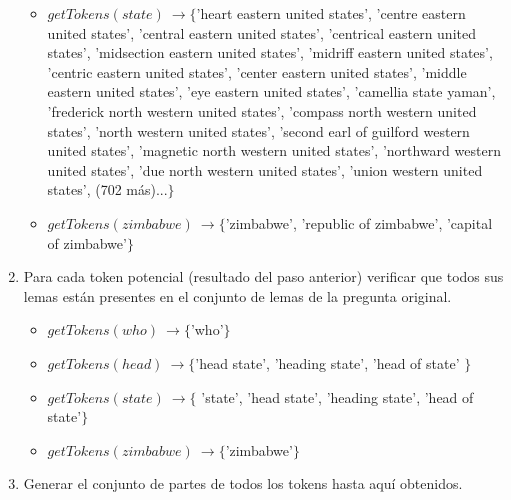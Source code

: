 \begin{enumerate}
\begin{itemize}
    \item $getTokens(state)\ \rightarrow  \{$'heart eastern united states', 'centre eastern united states', 'central eastern united states', 'centrical eastern united states', 'midsection eastern united states', 'midriff eastern united states', 'centric eastern united states', 'center eastern united states', 'middle eastern united states', 'eye eastern united states', 'camellia state yaman', 'frederick north western united states', 'compass north western united states', 'north western united states', 'second earl of guilford western united states', 'magnetic north western united states', 'northward western united states', 'due north western united states', 'union western united states', (702 más)...$\}$
    \item $getTokens(zimbabwe)\ \rightarrow \{$'zimbabwe', 'republic of zimbabwe', 'capital of zimbabwe'$\}$
  \end{itemize}
  \item Para cada token potencial (resultado del paso anterior) verificar que todos sus lemas están presentes en el conjunto de lemas de la pregunta original.
  \begin{itemize}
    \item $getTokens(who)\ \rightarrow \{$'who'$\}$
    \item $getTokens(head)\ \rightarrow \{$'head state', 'heading state', 'head of state' $\}$
    \item $getTokens(state)\ \rightarrow  \{$  'state', 'head state', 'heading state', 'head of state'$\}$
    \item $getTokens(zimbabwe)\ \rightarrow \{$'zimbabwe'$\}$
  \end{itemize}
  \item Generar el conjunto de partes de todos los tokens hasta aquí obtenidos.
  \newline

\end{enumerate}
